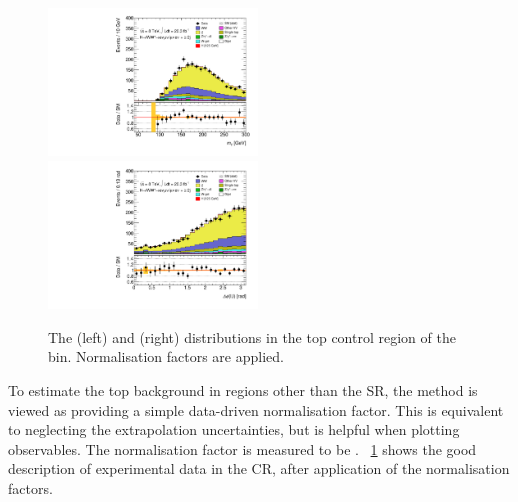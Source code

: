 \begin{figure}[t]
	\includegraphics[width=0.495\textwidth]{tex/backgrounds/emme_CutFailVBFHighMllTopCR_2jetincl_MT_TrackHWW_Clj_mh125_lin}
	\hfill
	\includegraphics[width=0.495\textwidth]{tex/backgrounds/emme_CutFailVBFHighMllTopCR_2jetincl_DPhill_mh125_lin}
	\caption{The \mt (left) and \dphill (right) distributions in the top control region of 
	the \twojet bin. Normalisation factors are applied.}
	\label{fig:top:2j}
\end{figure}

To estimate the top background in \twojet regions other than the SR, the method is viewed 
as providing a simple data-driven normalisation factor. This is equivalent to neglecting 
the extrapolation uncertainties, but is helpful when plotting observables. The 
normalisation factor is measured to be . 
\Figure~\ref{fig:top:2j} shows the good description of experimental data in the CR, 
after application of the normalisation factors.

